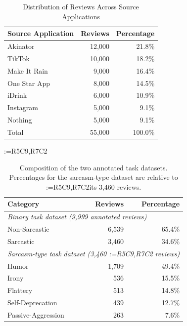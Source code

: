 \documentclass[a4paper,fleqn]{cas-sc}
\makeatletter
\newif\iftracked
\newcommand{\rv@setcolour}[1]{%
  \IfStrEq{#1}{R7C7}{\color{rvEdit}}{%
    \IfSubStr{#1}{R5}{\IfSubStr{#1}{R7}{\color{rvBoth}}{\color{rvFive}}}{\color{rvSeven}}}}
\newcommand{\rv@tag}[1]{\textsuperscript{\sffamily\bfseries\scriptsize[\StrSubstitute{#1}{,}{, }]}\,}
\newcommand{\rv@recordone}[1]{%
  \edef\rv@i{#1}%
  \ifcsdef{rv@n@\rv@i}{}{\csgdef{rv@n@\rv@i}{0}}%
  \csxdef{rv@n@\rv@i}{\the\numexpr\csuse{rv@n@\rv@i}+1\relax}%
  \begingroup\edef\@currentlabel{\rv@i}\label{rv:\rv@i:\csuse{rv@n@\rv@i}}\endgroup}
\newcommand{\rv@record}[1]{\@for\rv@id:=#1\do{\expandafter\rv@recordone\expandafter{\rv@id}}}
\DeclareRobustCommand{\rcmark}[1]{\rv@record{#1}}
\DeclareRobustCommand{\rcdel}[2]{\rv@record{#1}\iftracked{\rv@setcolour{#1}\rv@tag{#1}\rv@strike{#2}}\else\unskip\fi}
\DeclareRobustCommand{\rcrep}[3]{\rv@record{#1}\iftracked{\rv@setcolour{#1}\rv@tag{#1}\rv@strike{#2} #3}\else#3\fi}
\makeatother
\begin{document}
\begin{table}[t]
\caption{Distribution of Reviews Across Source Applications}
\label{tab:apps}
\centering\small
\begin{tabular}{lrr}
\toprule
Source Application & Reviews & Percentage \\
\midrule
Akinator & 12,000 & 21.8\% \\
TikTok & 10,000 & 18.2\% \\
Make It Rain & 9,000 & 16.4\% \\
One Star App & 8,000 & 14.5\% \\
iDrink & 6,000 & 10.9\% \\
Instagram & 5,000 & 9.1\% \\
Nothing & 5,000 & 9.1\% \\
\midrule
Total & 55,000 & 100.0\% \\
\bottomrule
\end{tabular}
\end{table}

\begin{table}[t]
\caption{Composition of the two annotated task datasets. Percentages for the sarcasm-type dataset are relative to \rcrep{R5C9,R7C2}{the 3,460 sarcastic reviews}{its 3,460 reviews}.}
\rcmark{R5C9,R7C2}
\label{tab:composition}
\centering\small
\begin{tabular}{lrr}
\toprule
Category & Reviews & Percentage \\
\midrule
\multicolumn{3}{l}{\textit{Binary task dataset (9,999 annotated reviews)}} \\
Non-Sarcastic & 6,539 & 65.4\% \\
Sarcastic & 3,460 & 34.6\% \\
\midrule
\multicolumn{3}{l}{\textit{Sarcasm-type task dataset (3,460 \rcdel{R5C9,R7C2}{sarcastic} reviews)}} \\
Humor & 1,709 & 49.4\% \\
Irony & 536 & 15.5\% \\
Flattery & 513 & 14.8\% \\
Self-Deprecation & 439 & 12.7\% \\
Passive-Aggression & 263 & 7.6\% \\
\bottomrule
\end{tabular}
\end{table}
\end{document}
